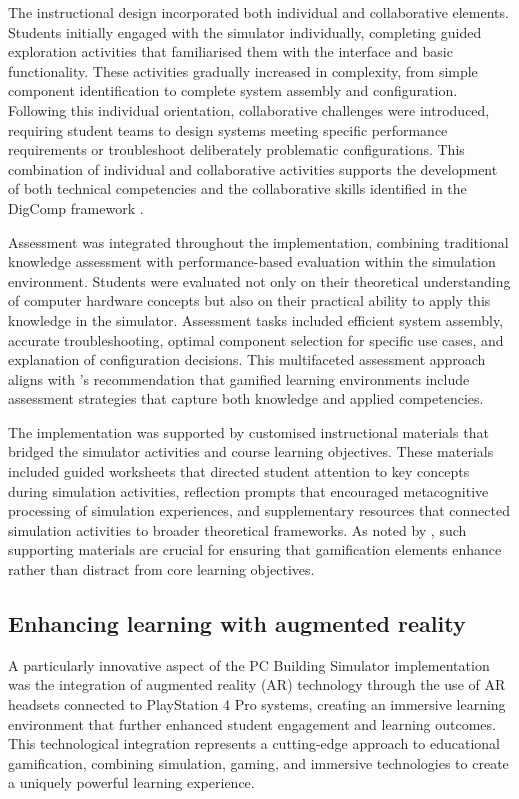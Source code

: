 \documentclass[cte]{acnsart}
\begin{document}
The instructional design incorporated both individual and collaborative elements. Students initially engaged with the simulator individually, completing guided exploration activities that familiarised them with the interface and basic functionality. These activities gradually increased in complexity, from simple component identification to complete system assembly and configuration. Following this individual orientation, collaborative challenges were introduced, requiring student teams to design systems meeting specific performance requirements or troubleshoot deliberately problematic configurations. This combination of individual and collaborative activities supports the development of both technical competencies and the collaborative skills identified in the DigComp framework \cite{Vuorikari2016}.

Assessment was integrated throughout the implementation, combining traditional knowledge assessment with performance-based evaluation within the simulation environment. Students were evaluated not only on their theoretical understanding of computer hardware concepts but also on their practical ability to apply this knowledge in the simulator. Assessment tasks included efficient system assembly, accurate troubleshooting, optimal component selection for specific use cases, and explanation of configuration decisions. This multifaceted assessment approach aligns with \citet{Adams2022119}'s recommendation that gamified learning environments include assessment strategies that capture both knowledge and applied competencies.

The implementation was supported by customised instructional materials that bridged the simulator activities and course learning objectives. These materials included guided worksheets that directed student attention to key concepts during simulation activities, reflection prompts that encouraged metacognitive processing of simulation experiences, and supplementary resources that connected simulation activities to broader theoretical frameworks. As noted by \citet{Figg20181215}, such supporting materials are crucial for ensuring that gamification elements enhance rather than distract from core learning objectives.

\subsection{Enhancing learning with augmented reality}

A particularly innovative aspect of the PC Building Simulator implementation was the integration of augmented reality (AR) technology through the use of AR headsets connected to PlayStation 4 Pro systems, creating an immersive learning environment that further enhanced student engagement and learning outcomes. This technological integration represents a cutting-edge approach to educational gamification, combining simulation, gaming, and immersive technologies to create a uniquely powerful learning experience.
\end{document}
